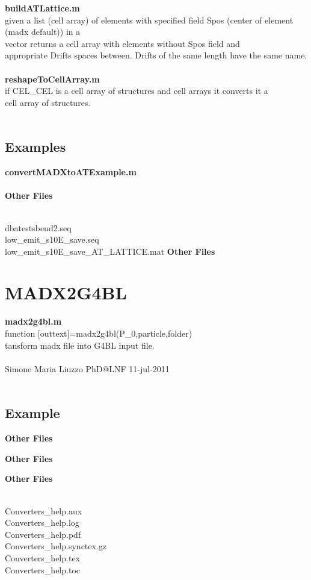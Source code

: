 \documentclass[a4paper,12pt]{report}
\begin{document}
{\bf buildATLattice.m}\\
  given a list (cell array) of elements with specified field Spos (center of element (madx default)) in a\\
  vector returns a cell array with elements without Spos field and\\
  appropriate Drifts spaces between. Drifts of the same length have the same name.\\
\\

{\bf reshapeToCellArray.m}\\
  if CEL\_CEL is a cell array of structures and cell arrays it converts it a\\
  cell array of structures.\\
\\
\section{Examples}

{\bf convertMADXtoATExample.m}\\
\\
{\bf  Other Files}

 \\
dbatestsbend2.seq \\
low\_emit\_s10E\_save.seq \\
low\_emit\_s10E\_save\_AT\_LATTICE.mat
{\bf  Other Files}


\chapter{MADX2G4BL}

{\bf madx2g4bl.m}\\
  function [outtext]=madx2g4bl(P\_0,particle,folder)\\
  tansform madx file into G4BL input file.\\
 \\
  Simone Maria Liuzzo PhD@LNF 11-jul-2011\\
\\
\section{Example}
{\bf  Other Files}


{\bf  Other Files}


{\bf  Other Files}

 \\
Converters\_help.aux \\
Converters\_help.log \\
Converters\_help.pdf \\
Converters\_help.synctex.gz \\
Converters\_help.tex \\
Converters\_help.toc

  
\end{document}
